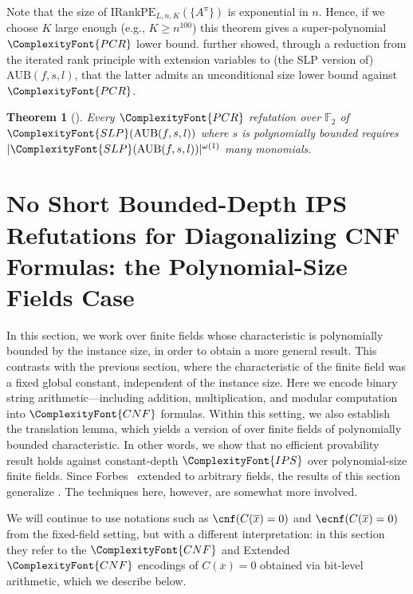 \documentclass[11pt,letter]{article}
\newtheorem{theorem}{Theorem}[section]
\theoremstyle{remark} %
\newcommand{\IRankPE}{\mathrm{IRankPE}} %
\newcommand{\AUB}{\mathrm{AUB}} %
\newcommand{\IPS}{%
    {
        \ComplexityFont{IPS} 
    }
}
\newcommand{\CNF}{ %
    {
        \ComplexityFont{CNF}
    }
}
\newcommand{\SLP}{ %
    {
        \ComplexityFont{SLP}
    }
}
\newcommand{\PCR}{ %
    {
        \ComplexityFont{PCR}
    }
}
\newcommand{\F}{\mathbb{F}}
\begin{document}
{    Note that the size of $\IRankPE_{L, n ,K}(\{A^\pi\})$ is exponential in $n$. Hence, if we choose $K$ large enough (e.g., $K\ge n^{100}$) this theorem gives a super-polynomial $\PCR$ lower bound.
    \cite{GGLST25} further showed, through a reduction from the iterated rank principle with extension variables to (the SLP  version of) $\AUB(f,s,l)$, that the latter admits an unconditional size lower bound against $\PCR$.


    \begin{theorem}[\cite{GGLST25}]
        \label{theorem: super-poly lower bound for AUP}
        Every $\PCR$ refutation over $\F_2$ of $\SLP(\AUB(f,s, l))$ where $s$ is polynomially bounded requires $|\SLP(\AUB(f,s, l))|^{\omega(1)}$ many monomials.
    \end{theorem}
    

\section{No Short Bounded-Depth IPS Refutations for Diagonalizing CNF Formulas: the Polynomial-Size Fields Case}

In this section, we work over finite fields whose characteristic is polynomially bounded by the instance size, in order to obtain a more general result. This contrasts with the previous section, where the characteristic of the finite field was a fixed global constant, independent of the instance size. Here we encode binary string arithmetic—including addition, multiplication, and modular computation into $\CNF$ formulas. Within this setting, we also establish the translation lemma, which yields a version of  over finite fields of polynomially bounded characteristic. In other words, we show that no efficient provability result holds against constant-depth $\IPS$ over polynomial-size finite fields. Since Forbes~\cite{forbes2024low} extended \cite{LST25} to arbitrary fields, the results of this section generalize . The techniques here, however, are somewhat more involved.

We will continue to use notations such as $\cnf(C(\overline{x})=0)$ and $\ecnf(C(\overline{x})=0)$ from the fixed-field setting, but with a different interpretation: in this section they refer to the $\CNF$ and Extended $\CNF$ encodings of $C(\overline{x})=0$ obtained via bit-level arithmetic, which we describe below.

}
\end{document}

